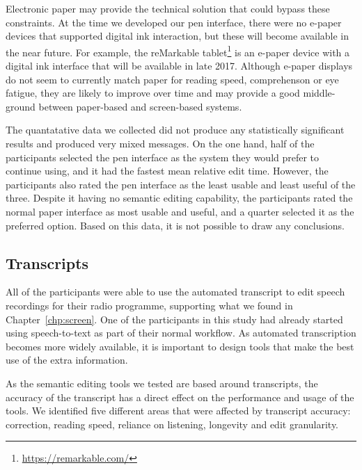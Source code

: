 
Electronic paper may provide the technical solution that could bypass these constraints. At the time we developed
our pen interface, there were no e-paper devices that supported digital ink interaction, but these will become
available in the near future.  For example, the reMarkable tablet\footnote{\url{https://remarkable.com/}} is an e-paper
device with a digital ink interface that will be available in late 2017. Although e-paper displays do not seem to
currently match paper for reading speed, comprehenson or eye fatigue, they are likely to improve over time and may
provide a good middle-ground between paper-based and screen-based systems. 

The quantatative data we collected did not produce any statistically significant results and produced very mixed
messages. On the one hand, half of the participants selected the pen interface as the system they would prefer to
continue using, and it had the fastest mean relative edit time. However, the participants also rated the pen interface
as the least usable and least useful of the three.  Despite it having no semantic editing capability, the participants
rated the normal paper interface as most usable and useful, and a quarter selected it as the preferred option.
Based on this data, it is not possible to draw any conclusions.

\subsection{Transcripts}

All of the participants were able to use the automated transcript to edit speech recordings for their radio programme,
supporting what we found in Chapter~\ref{chp:screen}. One of the participants in this study had already started using
speech-to-text as part of their normal workflow. As automated transcription becomes more widely available, it is
important to design tools that make the best use of the extra information.

As the semantic editing tools we tested are based around transcripts, the accuracy of the transcript has a direct
effect on the performance and usage of the tools. We identified five different areas that were affected by transcript
accuracy: correction, reading speed, reliance on listening, longevity and edit granularity.

